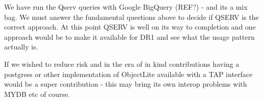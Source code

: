 We have run the Qserv queries with Google BigQuery  (REF?)  - and its a mix bag. We must answer the fundamental questions above to decide if QSERV  is the correct approach. At this point QSERV is well on its way to completion and one approach would be to make it available for DR1 and see what the usage pattern actually is.

If we wished to reduce risk and in the era of in kind contributions having a postgress or other implementation of ObjectLite available with a TAP interface would be a super contribution - this may bring its own interop problems with MYDB etc of course.

